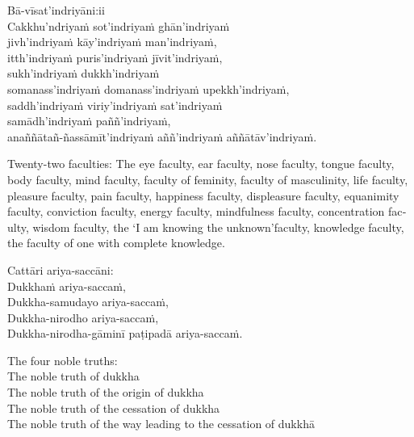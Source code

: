 \suttaRef{[MN 115]}

Bā-vīsat'indriyāni:ii\\
Cakkhu'ndriyaṁ sot'indriyaṁ ghān'indriyaṁ\\
jivh'indriyaṁ kāy'indriyaṁ man'indriyaṁ,\\
itth'indriyaṁ puris'indriyaṁ jīvit'indriyaṁ,\\
sukh'indriyaṁ dukkh'indriyaṁ\\
somanass'indriyaṁ domanass'indriyaṁ upekkh'indriyaṁ,\\
saddh'indriyaṁ viriy'indriyaṁ sat'indriyaṁ\\
samādh'indriyaṁ paññ'indriyaṁ,\\
anaññātañ-ñassāmīt'indriyaṁ aññ'indriyaṁ aññātāv'indriyaṁ.

\begin{english}
  Twenty-two faculties: The eye faculty, ear faculty, nose faculty, tongue faculty, body faculty, mind faculty, faculty of feminity, faculty of masculinity, life faculty, pleasure faculty, pain faculty, happiness faculty, displeasure faculty, equanimity faculty, conviction faculty, energy faculty, mindfulness faculty, concentration faculty, wisdom faculty, the `I am knowing the unknown'faculty, knowledge faculty, the faculty of one with complete knowledge.
\end{english}

\suttaRef{[Vibh]}

Cattāri ariya-saccāni:\\
Dukkhaṁ ariya-saccaṁ,\\
Dukkha-samudayo ariya-saccaṁ,\\
Dukkha-nirodho ariya-saccaṁ,\\
Dukkha-nirodha-gāminī paṭipadā ariya-saccaṁ.

\begin{english}
  The four noble truths:\\
  The noble truth of dukkha\\
  The noble truth of the origin of dukkha\\
  The noble truth of the cessation of dukkha\\
  The noble truth of the way leading to the cessation of dukkhā
\end{english}

\suttaRef{[SN 56.24]}

